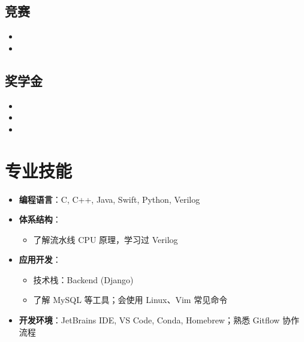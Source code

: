 \documentclass{resume}
\begin{document}
\subsection{\textbf{竞赛}}
\begin{itemize}
  \item {}
  \item {}
\end{itemize}

\subsection{\textbf{奖学金}}
\begin{itemize}
  \item {}
  \item {}
  \item {}
\end{itemize}

\section{专业技能}
\begin{itemize}
  \item \textbf{编程语言}：C, C++, Java, Swift, Python, Verilog

  \item \textbf{体系结构}：
    \begin{itemize}
      \item 了解流水线 CPU 原理，学习过 Verilog 
    \end{itemize}

  \item \textbf{应用开发}：
    \begin{itemize}
      \item 技术栈：Backend (Django)
      \item 了解 MySQL 等工具；会使用 Linux、Vim 常见命令
    \end{itemize}

  \item \textbf{开发环境}：JetBrains IDE, VS Code, Conda, Homebrew；熟悉 Gitflow 协作流程
\end{itemize}

\end{document}
